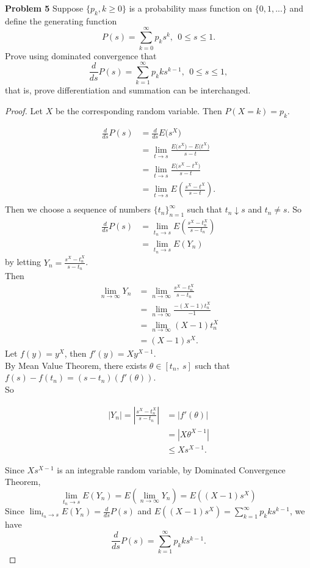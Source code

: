\documentclass{article}
\begin{document}
\newpage

\noindent \textbf{Problem 5} Suppose $\{p_k,k \geq 0\}$ is a probability mass function on $\{0,1,...\}$ and define the generating function 
\[ P(s) = \sum_{k=0}^{\infty}p_ks^k, ~~0 \leq s \leq 1.\]
Prove using dominated convergence that 
\[ \frac{d}{ds}P(s) = \sum_{k=1}^{\infty}p_kks^{k-1},~~0\leq s \leq 1, 	\]
that is, prove differentiation and summation can be interchanged.\\

\begin{proof}
  Let $X$ be the corresponding random variable. Then $P(X = k) = p_k$.

  \begin{align*}
  	\frac{d}{ds}P(s) &= \frac{d}{ds}E\big(s^{X}\big) \\
  					 &= \lim_{t \to s} \frac{E\big(s^{X}\big) - E\big(t^{X}\big)}{s-t} \\
  					 &= \lim_{t \to s} \frac{E\big(s^{X} - t^{X}\big)}{s-t} \\
  					 &= \lim_{t \to s} E\left(\frac{s^{X} - t^{X}}{s-t}\right). \\
  \end{align*}
  Then we choose a sequence of numbers $\{t_n\}_{n=1}^{\infty}$ such that $t_n \downarrow s$ and $t_n \neq s$.
  So 
  \begin{align*}
	\frac{d}{ds}P(s) &= \lim_{t_n \to s} E\left(\frac{s^{X} - t_n^{X}}{s-t_n}\right) \\
					&=\lim_{t_n \to s} E(Y_n) 
  \end{align*}
  by letting $Y_n = \frac{s^{X} - t_n^{X}}{s-t_n}$.\\
  Then 	
  \begin{align*}
  	 \lim_{n \to \infty}Y_n &=\lim_{n \to \infty} \frac{s^{X} - t_n^{X}}{s-t_n}\\
  							&= \lim_{n \to \infty} \frac{- (X-1)t_n^{X}}{-1}\\ 
  							&= \lim_{n \to \infty} (X-1)t_n^{X} \\
  							&= (X-1)s^X.
  \end{align*}
  Let $f(y) = y^X$, then $f'(y) = Xy^{X-1}$.\\
  By Mean Value Theorem, there exists $\theta \in [t_n,~s]$ such that $f(s) -f(t_n) = (s-t_n)(f'(\theta))$.\\
  So 

  \begin{align*}
  	\left| Y_n\right| = \left |\frac{s^X -t_n^X}{s-t_n} \right |  &= \left|f'(\theta)\right| \\
  											&= \left|X \theta^{X -1}\right| \\
  											& \leq  Xs^{X-1}.  
  \end{align*}

 Since $Xs^{X-1}$ is an integrable random variable, by Dominated Convergence Theorem,
 \[\lim_{t_n \to s} E(Y_n) = E(\lim_{n \to \infty}Y_n) = E\left((X-1)s^X\right)\]
 Since $\lim_{t_n \to s} E(Y_n) = \frac{d}{ds}P(s)$ and $E\left((X-1)s^X\right) = \sum_{k=1}^{\infty}p_kks^{k-1}$,
 we have
 \[ \frac{d}{ds}P(s) = \sum_{k=1}^{\infty}p_kks^{k-1}.\]
\end{proof}
\end{document}
